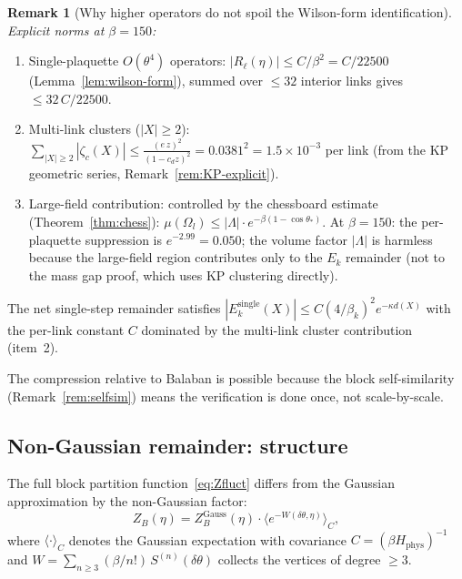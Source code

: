 \documentclass[11pt]{article}
\theoremstyle{definition}
\newtheorem{remark}[theorem]{Remark}
\begin{document}
\begin{remark}[Why higher operators do not spoil the Wilson-form identification]
\emph{Explicit norms at $\beta=150$:}
\begin{enumerate}[nosep]
\item Single-plaquette $O(\theta^4)$ operators:
$|R_\ell(\eta)|\le C/\beta^2=C/22500$
(Lemma~\ref{lem:wilson-form}), summed over $\le 32$
interior links gives
$\le 32\,C/22500$.
\item Multi-link clusters ($|X|\ge 2$):
$\sum_{|X|\ge 2}|\zeta_c(X)|\le\frac{(e\,z)^2}{(1-c_d z)^2}
=0.0381^2=1.5\times 10^{-3}$
per link (from the KP geometric series,
Remark~\ref{rem:KP-explicit}).
\item Large-field contribution:
controlled by the chessboard estimate
(Theorem~\ref{thm:chess}):
$\mu(\Omega_l)\le|\Lambda|\cdot e^{-\beta(1-\cos\theta_*)}$.
At $\beta=150$: the per-plaquette suppression is
$e^{-2.99}=0.050$; the volume factor $|\Lambda|$ is
harmless because the large-field region contributes only to
the $E_k$ remainder (not to the mass gap proof, which uses
KP clustering directly).
\end{enumerate}
The net single-step remainder satisfies
$|E_k^{\mathrm{single}}(X)|\le C(4/\beta_k)^2 e^{-\kappa d(X)}$
with the per-link constant $C$ dominated by the
multi-link cluster contribution (item~2).

The compression relative to Balaban is possible because the block
self-similarity (Remark~\ref{rem:selfsim}) means the verification
is done once, not scale-by-scale.
\end{remark}

\subsection{Non-Gaussian remainder: structure}\label{subsec:nongauss}

The full block partition function~\eqref{eq:Zfluct} differs from the
Gaussian approximation by the non-Gaussian factor:
\begin{equation}\label{eq:NG}
Z_B(\eta)=Z_B^{\mathrm{Gauss}}(\eta)\cdot
\bigl\langle e^{-W(\delta\theta,\eta)}\bigr\rangle_C,
\end{equation}
where $\langle\cdot\rangle_C$ denotes the Gaussian expectation with
covariance $C=(\beta H_{\mathrm{phys}})^{-1}$ and
$W=\sum_{n\ge 3}(\beta/n!)\,S^{(n)}(\delta\theta)$ collects the
vertices of degree $\ge 3$.
\end{document}

